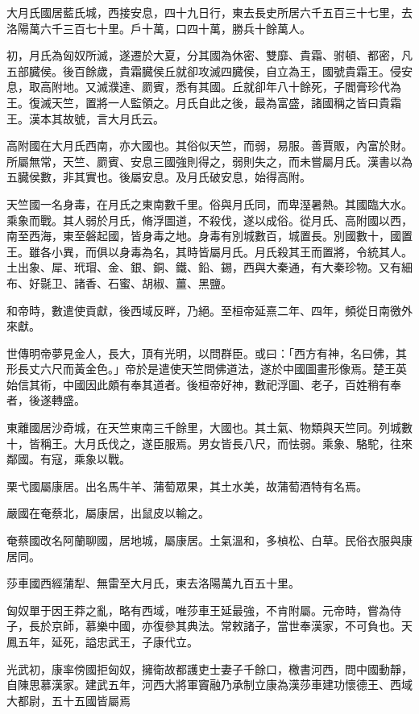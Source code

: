 \begin{pinyinscope}
大月氏國居藍氏城，西接安息，四十九日行，東去長史所居六千五百三十七里，去洛陽萬六千三百七十里。戶十萬，口四十萬，勝兵十餘萬人。

初，月氏為匈奴所滅，遂遷於大夏，分其國為休密、雙靡、貴霜、驸頓、都密，凡五部臓侯。後百餘歲，貴霜臓侯丘就卻攻滅四臓侯，自立為王，國號貴霜王。侵安息，取高附地。又滅濮達、罽賓，悉有其國。丘就卻年八十餘死，子閻膏珍代為王。復滅天竺，置將一人監領之。月氏自此之後，最為富盛，諸國稱之皆曰貴霜王。漢本其故號，言大月氏云。

高附國在大月氏西南，亦大國也。其俗似天竺，而弱，易服。善賈販，內富於財。所屬無常，天竺、罽賓、安息三國強則得之，弱則失之，而未嘗屬月氏。漢書以為五臓侯數，非其實也。後屬安息。及月氏破安息，始得高附。

天竺國一名身毒，在月氏之東南數千里。俗與月氏同，而卑溼暑熱。其國臨大水。乘象而戰。其人弱於月氏，脩浮圖道，不殺伐，遂以成俗。從月氏、高附國以西，南至西海，東至磐起國，皆身毒之地。身毒有別城數百，城置長。別國數十，國置王。雖各小異，而俱以身毒為名，其時皆屬月氏。月氏殺其王而置將，令統其人。土出象、犀、玳瑁、金、銀、銅、鐵、鉛、錫，西與大秦通，有大秦珍物。又有細布、好毾卫、諸香、石蜜、胡椒、薑、黑鹽。

和帝時，數遣使貢獻，後西域反畔，乃絕。至桓帝延熹二年、四年，頻從日南徼外來獻。

世傳明帝夢見金人，長大，頂有光明，以問群臣。或曰：「西方有神，名曰佛，其形長丈六尺而黃金色。」帝於是遣使天竺問佛道法，遂於中國圖畫形像焉。楚王英始信其術，中國因此頗有奉其道者。後桓帝好神，數祀浮圖、老子，百姓稍有奉者，後遂轉盛。

東離國居沙奇城，在天竺東南三千餘里，大國也。其土氣、物類與天竺同。列城數十，皆稱王。大月氏伐之，遂臣服焉。男女皆長八尺，而怯弱。乘象、駱駝，往來鄰國。有寇，乘象以戰。

栗弋國屬康居。出名馬牛羊、蒲萄眾果，其土水美，故蒲萄酒特有名焉。

嚴國在奄蔡北，屬康居，出鼠皮以輸之。

奄蔡國改名阿蘭聊國，居地城，屬康居。土氣溫和，多楨松、白草。民俗衣服與康居同。

莎車國西經蒲犁、無雷至大月氏，東去洛陽萬九百五十里。

匈奴單于因王莽之亂，略有西域，唯莎車王延最強，不肯附屬。元帝時，嘗為侍子，長於京師，慕樂中國，亦復參其典法。常敕諸子，當世奉漢家，不可負也。天鳳五年，延死，謚忠武王，子康代立。

光武初，康率傍國拒匈奴，擁衛故都護吏士妻子千餘口，檄書河西，問中國動靜，自陳思慕漢家。建武五年，河西大將軍竇融乃承制立康為漢莎車建功懷德王、西域大都尉，五十五國皆屬焉


\end{pinyinscope}
